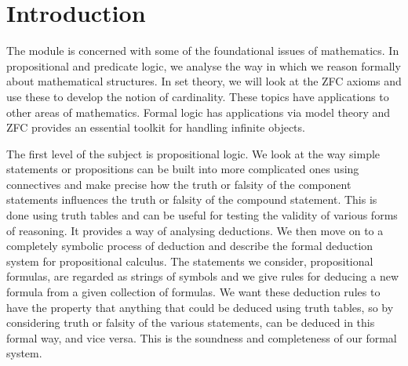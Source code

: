 

\newcommand{\andb}[2]{\br{#1 \land #2}}
\newcommand{\eqb}[2]{\br{#1 = #2}}
\newcommand{\fab}[1]{\br{\forall #1}}
\newcommand{\iffb}[2]{\br{#1 \leftrightarrow #2}}
\newcommand{\impb}[2]{\br{#1 \rightarrow #2}}
\newcommand{\inb}[2]{\br{#1 \in #2}}
\newcommand{\leb}[2]{\br{#1 \le #2}}
\newcommand{\ltb}[2]{\br{#1 < #2}}
\newcommand{\notb}[1]{\br{\neg #1}}
\newcommand{\orb}[2]{\br{#1 \lor #2}}
\newcommand{\teb}[1]{\br{\exists #1}}





\section{Introduction}


The module is concerned with some of the foundational issues of mathematics. In propositional and predicate logic, we analyse the way in which we reason formally about mathematical structures. In set theory, we will look at the ZFC axioms and use these to develop the notion of cardinality. These topics have applications to other areas of mathematics. Formal logic has applications via model theory and ZFC provides an essential toolkit for handling infinite objects.

The first level of the subject is propositional logic. We look at the way simple statements or propositions can be built into more complicated ones using connectives and make precise how the truth or falsity of the component statements influences the truth or falsity of the compound statement. This is done using truth tables and can be useful for testing the validity of various forms of reasoning. It provides a way of analysing deductions. We then move on to a completely symbolic process of deduction and describe the formal deduction system for propositional calculus. The statements we consider, propositional formulas, are regarded as strings of symbols and we give rules for deducing a new formula from a given collection of formulas. We want these deduction rules to have the property that anything that could be deduced using truth tables, so by considering truth or falsity of the various statements, can be deduced in this formal way, and vice versa. This is the soundness and completeness of our formal system.

